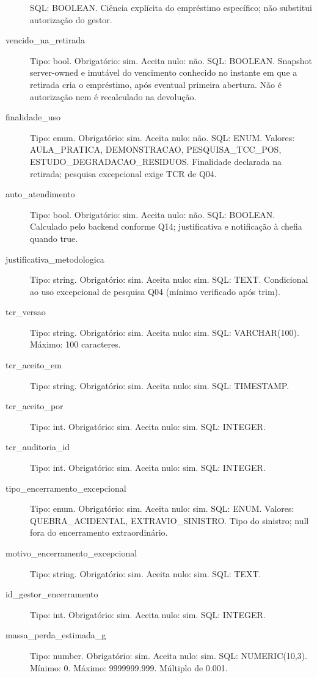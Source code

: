 \begin{description}
SQL: BOOLEAN.
Ciência explícita do empréstimo específico; não substitui autorização do gestor.
\item[vencido\_na\_retirada] Tipo: bool. Obrigatório: sim. Aceita nulo: não.
SQL: BOOLEAN.
Snapshot server-owned e imutável do vencimento conhecido no instante em que a retirada cria o empréstimo, após eventual primeira abertura. Não é autorização nem é recalculado na devolução.
\item[finalidade\_uso] Tipo: enum. Obrigatório: sim. Aceita nulo: não.
SQL: ENUM.
Valores: AULA\_PRATICA, DEMONSTRACAO, PESQUISA\_TCC\_POS, ESTUDO\_DEGRADACAO\_RESIDUOS.
Finalidade declarada na retirada; pesquisa excepcional exige TCR de Q04.
\item[auto\_atendimento] Tipo: bool. Obrigatório: sim. Aceita nulo: não.
SQL: BOOLEAN.
Calculado pelo backend conforme Q14; justificativa e notificação à chefia quando true.
\item[justificativa\_metodologica] Tipo: string. Obrigatório: sim. Aceita nulo: sim.
SQL: TEXT.
Condicional ao uso excepcional de pesquisa Q04 (mínimo verificado após trim).
\item[tcr\_versao] Tipo: string. Obrigatório: sim. Aceita nulo: sim.
SQL: VARCHAR(100).
Máximo: 100 caracteres.
\item[tcr\_aceito\_em] Tipo: string. Obrigatório: sim. Aceita nulo: sim.
SQL: TIMESTAMP.
\item[tcr\_aceito\_por] Tipo: int. Obrigatório: sim. Aceita nulo: sim.
SQL: INTEGER.
\item[tcr\_auditoria\_id] Tipo: int. Obrigatório: sim. Aceita nulo: sim.
SQL: INTEGER.
\item[tipo\_encerramento\_excepcional] Tipo: enum. Obrigatório: sim. Aceita nulo: sim.
SQL: ENUM.
Valores: QUEBRA\_ACIDENTAL, EXTRAVIO\_SINISTRO.
Tipo do sinistro; null fora do encerramento extraordinário.
\item[motivo\_encerramento\_excepcional] Tipo: string. Obrigatório: sim. Aceita nulo: sim.
SQL: TEXT.
\item[id\_gestor\_encerramento] Tipo: int. Obrigatório: sim. Aceita nulo: sim.
SQL: INTEGER.
\item[massa\_perda\_estimada\_g] Tipo: number. Obrigatório: sim. Aceita nulo: sim.
SQL: NUMERIC(10,3).
Mínimo: 0.
Máximo: 9999999.999.
Múltiplo de 0.001.
\end{description}
